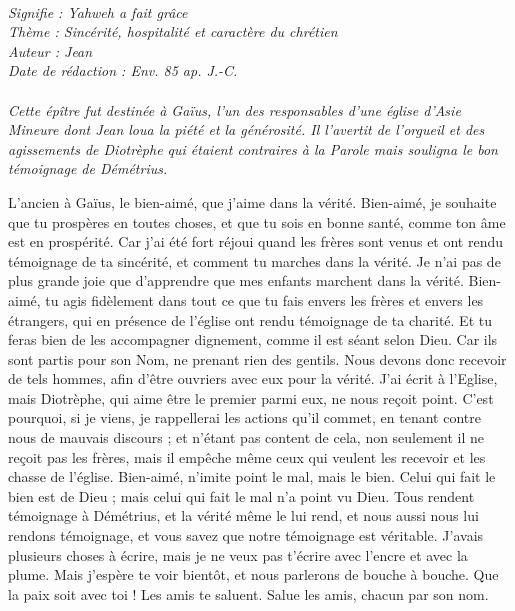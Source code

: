 \BFont
\noindent\hrulefill
{\footnotesize
\textit{
\bigskip
{\centering{}
\\Signifie : Yahweh a fait grâce
\\Thème : Sincérité, hospitalité et caractère du chrétien
\\Auteur : Jean
\\Date de rédaction : Env. 85 ap. J.-C.\\}
}
\textit{
\\Cette épître fut destinée à Gaïus, l’un des responsables d’une église d’Asie Mineure dont Jean loua la piété et la générosité. Il l’avertit de l’orgueil et des agissements de Diotrèphe qui étaient contraires à la Parole mais souligna le bon témoignage de Démétrius.\bigskip
}
}
\par\nobreak\noindent\hrulefill
\begin{multicols}{2}
\VerseOne{}L'ancien à Gaïus, le bien-aimé, que j'aime dans la vérité.
Bien-aimé, je souhaite que tu prospères en toutes choses, et que tu sois en bonne santé, comme ton âme est en prospérité.
Car j’ai été fort réjoui quand les frères sont venus et ont rendu témoignage de ta sincérité, et comment tu marches dans la vérité.
Je n'ai pas de plus grande joie que d’apprendre que mes enfants marchent dans la vérité.
Bien-aimé, tu agis fidèlement dans tout ce que tu fais envers les frères et envers les étrangers,
qui en présence de l'église ont rendu témoignage de ta charité. Et tu feras bien de les accompagner dignement, comme il est séant selon Dieu.
Car ils sont partis pour son Nom, ne prenant rien des gentils.
Nous devons donc recevoir de tels hommes, afin d’être ouvriers avec eux pour la vérité.
J'ai écrit à l'Eglise, mais Diotrèphe, qui aime être le premier parmi eux, ne nous reçoit point.
C'est pourquoi, si je viens, je rappellerai les actions qu'il commet, en tenant contre nous de mauvais discours ; et n'étant pas content de cela, non seulement il ne reçoit pas les frères, mais il empêche même ceux qui veulent les recevoir et les chasse de l'église.
Bien-aimé, n'imite point le mal, mais le bien. Celui qui fait le bien est de Dieu ; mais celui qui fait le mal n'a point vu Dieu.
Tous rendent témoignage à Démétrius, et la vérité même le lui rend, et nous aussi nous lui rendons témoignage, et vous savez que notre témoignage est véritable.
J'avais plusieurs choses à écrire, mais je ne veux pas t'écrire avec l'encre et avec la plume.
Mais j'espère te voir bientôt, et nous parlerons de bouche à bouche.
Que la paix soit avec toi ! Les amis te saluent. Salue les amis, chacun par son nom.
\PPE{}
\end{multicols}
